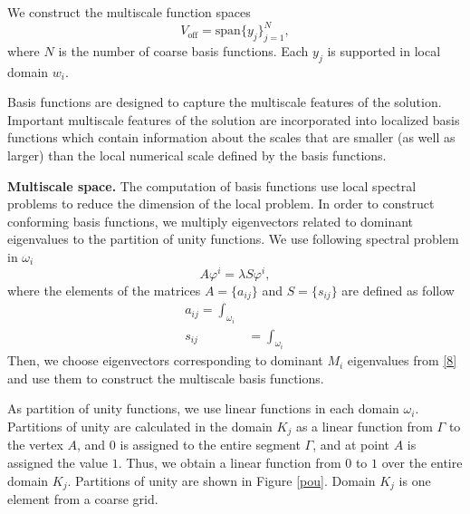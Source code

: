 \documentclass[preprint]{elsarticle}
\begin{document}
We construct the multiscale function spaces
\[
	{V}_{\text{off}} = \mbox{span} \{y_{j}\}_{j=1}^{N},
\]
where $N$ is the number of coarse basis functions.
Each $y_j$ is supported in local domain $w_i$.

Basis functions are designed to capture the multiscale features of the solution. 
Important multiscale features of the solution are incorporated into localized basis functions which contain information about the scales that are smaller (as well as larger) than the local numerical scale defined by the basis functions. 
 
\textbf{Multiscale space.}
The computation of basis functions use local spectral problems to reduce the dimension of the local problem. 
In order to construct conforming basis functions, we multiply eigenvectors related to dominant eigenvalues to the partition of unity functions.
We use following spectral problem in $\omega_i$
\begin{equation}\label{8}
	A \varphi^i = \lambda S \varphi^i,
\end{equation} 
where the elements of the matrices $A = \{a_{ij}\}$ and $S = \{s_{ij}\}$ are defined as follow{
\begin{equation}\label{9}
\begin{split}
	a_{ij} = 
	\int_{\omega_i} \\
	s_{ij} & = \int_{\omega _i}
\end{split}
\end{equation}}
Then, we choose eigenvectors corresponding to dominant $M_{i}$ eigenvalues from \eqref{8} and use them to construct the multiscale basis functions.

As partition of unity functions, we use linear functions in each domain $\omega_i$.
Partitions of unity are calculated in the domain $K_j$ as a linear function from $\Gamma$ to the vertex $A$, and $0$ is assigned to the entire segment $\Gamma$, and at point $A$ is assigned the value $1$. 
Thus, we obtain a linear function from $0$ to $1$ over the entire domain $K_j$. 
Partitions of unity are shown in Figure \ref{pou}. 
Domain $K_j$ is one element from a coarse grid. 
\end{document}
